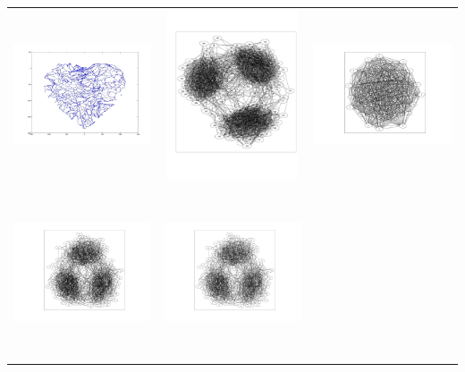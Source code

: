 \begin{tabular}{ |c|c|c| }
\includegraphics[width=5.0cm,height=5.0cm]{images/RoadMap.jpg}                                             &
\includegraphics[width=5.0cm,height=5.0cm]{images/ScaleFreeClusterGraph.jpg}                                &
\includegraphics[width=5.0cm,height=5.0cm]{images/WellConnectedWithRedBlackOrder_Bipatate.jpg}               \\
\includegraphics[width=5.0cm,height=5.0cm]{images/WellConnectedWithThreeClusters.jpg}                          &
\includegraphics[width=5.0cm,height=5.0cm]{images/WellConnectedWithThreeClusters2.jpg}                          &

\end{tabular}
